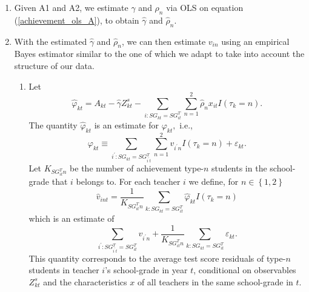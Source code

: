 \documentclass[notitlepage,12pt]{article}%
\begin{document}
\begin{enumerate}
\item Given A1 and A2, we estimate $\gamma$ and $\rho_{n}$ via OLS on equation
(\ref{achievement_ols_A}), to obtain $\hat{\gamma}$ and $\hat{\rho}_{n}.$

\item With the estimated $\hat{\gamma}$ and $\hat{\rho}_{n}$, we can then
estimate $v_{in}$ using an empirical Bayes estimator similar to the one of
\citet{kane2008estimating} which we adapt to take into account the structure
of our data.

\begin{enumerate}
\item Let
\begin{equation}
\widehat{\varphi}_{kt}=A_{kt}-\hat{\gamma}Z_{kt}^{s}-\sum_{i:SG_{kt}%
=SG_{it}^{T}}\sum_{n=1}^{2}\hat{\rho}_{n}x_{it}I(\tau_{k}=n).
\end{equation}
The quantity $\widehat{\varphi}_{kt}$ is an estimate for $\varphi_{kt},$
i.e.,
\[
\varphi_{kt}\equiv\sum_{i^{\prime}:SG_{kt}=SG_{i^{\prime}t}^{T}}\sum_{n=1}%
^{2}v_{i^{\prime}n}I(\tau_{k}=n)+\varepsilon_{kt}.
\]
Let $K_{SG_{it}^{T}n}$ be the number of achievement type-$n$ students in the
school-grade that $i$ belongs to. For each teacher $i$ we define, for
$n\in\left\{  1,2\right\}  $
\begin{equation}
\widehat{v}_{int}=\frac{1}{K_{SG_{it}^{T}n}}\sum_{k:SG_{kt}=SG_{it}^{T}%
}\widehat{\varphi}_{kt}I\left(  \tau_{k}=n\right)
\end{equation}
which is an estimate of
\[
\sum_{i^{\prime}:SG_{i^{\prime}t}^{T}=SG_{it}^{T}}v_{i^{\prime}n}+\frac
{1}{K_{SG_{it}^{T}n}}\sum_{k:SG_{kt}=SG_{it}^{T}}\varepsilon_{kt}.
\]
This quantity corresponds to the average test score residuals of type-$n$
students in teacher $i$'s school-grade in year $t$, conditional on observables
$Z_{kt}^{s}$ and the characteristics $x$ of all teachers in the same
school-grade in $t$.


\end{enumerate}
\end{enumerate}
\end{document}
